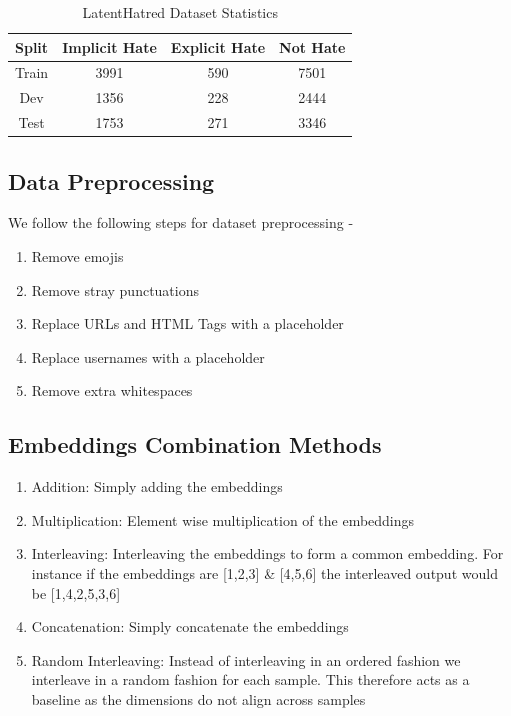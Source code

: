 \documentclass{article} %
\begin{document}
\begin{table}[h]
\begin{center}
\begin{tabular}{||c c c c||} 
 \hline
 Split & Implicit Hate & Explicit Hate & Not Hate \\  [0.5ex]
 \hline\hline
Train & 3991 & 590 & 7501 \\ 
 \hline
 Dev & 1356 & 228 & 2444 \\
 \hline
 Test & 1753 & 271 & 3346 \\
 \hline
\end{tabular}
\end{center}
\caption{LatentHatred Dataset Statistics}
\end{table}

\subsection{Data Preprocessing}
\label{dataset-preproc}

We follow the following steps for dataset preprocessing - 

\begin{enumerate}
    \item Remove emojis
    \item Remove stray punctuations
    \item Replace URLs and HTML Tags with a placeholder
    \item Replace usernames with a placeholder
    \item Remove extra whitespaces
\end{enumerate}




\subsection{Embeddings Combination Methods}
\label{embedding-combination}

\begin{enumerate}
    \item Addition: Simply adding the embeddings
    \item Multiplication: Element wise multiplication of the embeddings
    \item Interleaving: Interleaving the embeddings to form a common embedding. For instance if the embeddings are [1,2,3] \& [4,5,6] the interleaved output would be [1,4,2,5,3,6]
    \item Concatenation: Simply concatenate the embeddings
    \item Random Interleaving: Instead of interleaving in an ordered fashion we interleave in a random fashion for each sample. This therefore acts as a baseline as the dimensions do not align across samples
\end{enumerate}
\end{document}
